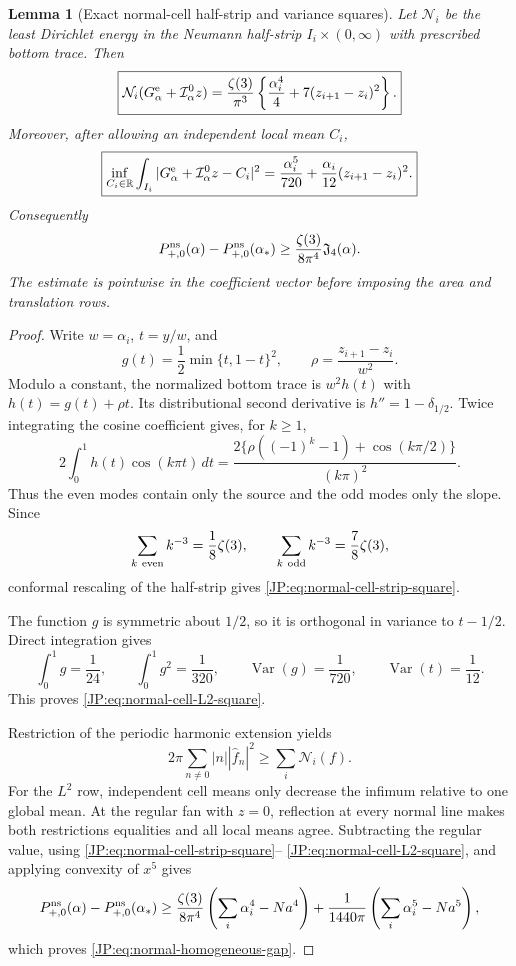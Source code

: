 \documentclass[11pt]{amsart}
\numberwithin{equation}{section}
\newtheorem{lemma}[theorem]{Lemma}
\theoremstyle{definition}
\theoremstyle{remark}
\newcommand{\Jfour}{\mathfrak J_4}
\begin{document}
\begin{lemma}[Exact normal-cell half-strip and variance squares]
\label{JP:lem:normal-cell-square}
Let $\mathcal N_i$ be the least Dirichlet energy in the Neumann half-strip
$I_i\times(0,\infty)$ with prescribed bottom trace.  Then
\begin{equation}\label{JP:eq:normal-cell-strip-square}
 \boxed{
 \mathcal N_i(G_\alpha^{\rm e}+\mathcal I_\alpha^0z)
 =\frac{\zeta(3)}{\pi^3}
 \left\{\frac{\alpha_i^4}{4}
       +7(z_{i+1}-z_i)^2\right\}.}
\end{equation}
Moreover, after allowing an independent local mean $C_i$,
\begin{equation}\label{JP:eq:normal-cell-L2-square}
 \boxed{
 \inf_{C_i\in\mathbb R}\int_{I_i}
 |G_\alpha^{\rm e}+\mathcal I_\alpha^0z-C_i|^2
 =\frac{\alpha_i^5}{720}
  +\frac{\alpha_i}{12}(z_{i+1}-z_i)^2.}
\end{equation}
Consequently
\begin{equation}\label{JP:eq:normal-homogeneous-gap}
 P_{+,0}^{\rm ns}(\alpha)-P_{+,0}^{\rm ns}(\alpha_*)
 \ge \frac{\zeta(3)}{8\pi^4}\Jfour(\alpha).
\end{equation}
The estimate is pointwise in the coefficient vector before imposing the
area and translation rows.
\end{lemma}

\begin{proof}
Write $w=\alpha_i$, $t=y/w$, and
\[
 g(t)=\frac12\min\{t,1-t\}^2,
 \qquad \rho=\frac{z_{i+1}-z_i}{w^2}.
\]
Modulo a constant, the normalized bottom trace is
$w^2h(t)$ with $h(t)=g(t)+\rho t$.  Its distributional second derivative
is $h''=1-\delta_{1/2}$.  Twice integrating the cosine coefficient gives,
for $k\ge1$,
\[
 2\int_0^1h(t)\cos(k\pi t)\,dt
 =\frac{2\{\rho((-1)^k-1)+\cos(k\pi/2)\}}{(k\pi)^2}.
\]
Thus the even modes contain only the source and the odd modes only the
slope.  Since
\[
 \sum_{k\ {\rm even}}k^{-3}=\frac18\zeta(3),
 \qquad
 \sum_{k\ {\rm odd}}k^{-3}=\frac78\zeta(3),
\]
conformal rescaling of the half-strip gives
\eqref{JP:eq:normal-cell-strip-square}.

The function $g$ is symmetric about $1/2$, so it is orthogonal in variance
to $t-1/2$.  Direct integration gives
\[
 \int_0^1g=\frac1{24},\qquad
 \int_0^1g^2=\frac1{320},\qquad
 \operatorname {Var}(g)=\frac1{720},\qquad
 \operatorname {Var}(t)=\frac1{12}.
\]
This proves \eqref{JP:eq:normal-cell-L2-square}.

Restriction of the periodic harmonic extension yields
\[
 2\pi\sum_{n\ne0}|n||\widehat f_n|^2
 \ge\sum_i\mathcal N_i(f).
\]
For the $L^2$ row, independent cell means only decrease the infimum relative
to one global mean.  At the regular fan with $z=0$, reflection at every
normal line makes both restrictions equalities and all local means agree.
Subtracting the regular value, using \eqref{JP:eq:normal-cell-strip-square}--
\eqref{JP:eq:normal-cell-L2-square}, and applying convexity of $x^5$ gives
\[
 P_{+,0}^{\rm ns}(\alpha)-P_{+,0}^{\rm ns}(\alpha_*)
 \ge\frac{\zeta(3)}{8\pi^4}
       \left(\sum_i\alpha_i^4-Na^4\right)
 +\frac1{1440\pi}
       \left(\sum_i\alpha_i^5-Na^5\right),
\]
which proves \eqref{JP:eq:normal-homogeneous-gap}.
\end{proof}
\end{document}
